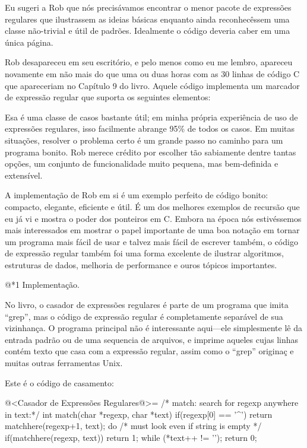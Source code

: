 Eu sugeri a Rob que nós precisávamos encontrar o menor pacote de
expressões regulares que ilustrassem as ideias básicas enquanto ainda
reconhecêssem uma classe não-trivial e útil de padrões. Idealmente o
código deveria caber em uma única página.

Rob desapareceu em seu escritório, e pelo menos como eu me lembro,
apareceu novamente em não mais do que uma ou duas horas com as 30
linhas de código C que apareceriam no Capítulo 9 do livro. Aquele
código implementa um marcador de expressão regular que suporta os
seguintes elementos:


Esa é uma classe de casos bastante útil; em minha própria experiência
de uso de expressões regulares, isso facilmente abrange 95\% de todos
os casos. Em muitas situações, resolver o problema certo é um grande
passo no caminho para um programa bonito. Rob merece crédito por
escolher tão sabiamente dentre tantas opções, um conjunto de
funcionalidade muito pequena, mas bem-definida e extensível.

A implementação de Rob em si é um exemplo perfeito de código bonito:
compacto, elegante, eficiente e útil. É um dos melhores exemplos de
recursão que eu já vi e mostra o poder dos ponteiros em C. Embora na
época nós estivéssemos mais interessados em mostrar o papel importante
de uma boa notação em tornar um programa mais fácil de usar e talvez
mais fácil de escrever também, o código de expressão regular também
foi uma forma excelente de ilustrar algoritmos, estruturas de dados,
melhoria de performance e ouros tópicos importantes.

@*1 Implementação.

No livro, o casador de expressões regulares é parte de um programa que
imita ``grep'', mas o código de expressão regular é completamente
separável de sua vizinhança. O programa principal não é interessante
aqui---ele simplesmente lê da entrada padrão ou de uma sequencia de
arquivos, e imprime aqueles cujas linhas contém texto que casa com a
expressão regular, assim como o ``grep'' originaç e muitas outras
ferramentas Unix.

Este é o código de casamento:

@<Casador de Expressões Regulares@>=
/* match: search for regexp anywhere in text:*/
int match(char *regexp, char *text){
  if(regexp[0] == '^')
    return matchhere(regexp+1, text);
  do{    /* must look even if string is empty */
    if(matchhere(regexp, text))
      return 1;
  } while (*text++ != '\0');
  return 0;
}

